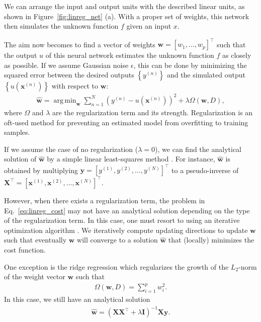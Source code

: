 \documentclass[dissertation,nocontribution,draft*]{aaltoseries}
\newcommand{\vect}[1]{\mathbf{#1}}
\newcommand{\matr}[1]{\mathbf{#1}}
\newcommand{\vx}[0]{\vect{x}}
\newcommand{\vy}[0]{\vect{y}}
\newcommand{\vw}[0]{\vect{w}}
\newcommand{\mX}[0]{\matr{X}}
\newcommand{\mI}{\matr{I}}
\DeclareMathOperator*{\argmin}{arg\,min}
\begin{document}
We can arrange the input and output units with the described
linear units, as shown in Figure~\ref{fig:linreg_net} (a). With
a proper set of weights, this network then simulates
the unknown function $f$ given an input $x$. 

The aim now becomes to find a vector of weights $\vw = [w_1,
\dots, w_p]^\top$ such that the output $u$ of this neural
network estimates the unknown function $f$ as closely as
possible. If we assume Gaussian noise $\epsilon$, this can
be done by minimizing the squared error between the desired
outputs $\left\{ y^{(n)} \right\}$ and the simulated output
$\left\{ u(\vx^{(n)}) \right\}$ with respect to $\vw$:
\begin{align}
    \label{eq:linreg_cost}
    \hat{\vw} = \argmin_{\vw} \sum_{n=1}^N \left( y^{(n)}
    - u\left(\vx^{(n)}\right) \right)^2 + \lambda \Omega
    \left(\vw, D\right),
\end{align}
where $\Omega$ and $\lambda$ are the regularization term and
its strength. Regularization is an oft-used method for
preventing an estimated model from overfitting to training
samples.

If we assume the case of no regularization ($\lambda = 0$),
we can find the analytical solution of $\hat{\vw}$ by a
simple linear least-squares method \citep[see,
e.g.,][]{Golub1996,Haykin2009}.  For instance, $\hat{\vw}$
is obtained by multiplying $\vy = \left[y^{(1)}, y^{(2)},
\dots, y^{(N)} \right]^\top$ to a pseudo-inverse of
$\mX^\top = \left[ \vx^{(1)}, \vx^{(2)}, \dots,
\vx^{(N)}\right]^\top$. 

However, when there exists a regularization term, the
problem in Eq.~\eqref{eq:linreg_cost} may not
have an analytical solution depending on the type of the
regularization term. In this case, one must resort to
using an iterative optimization algorithm \citep[see,
e.g.,][]{Fletcher1987}. We iteratively compute updating
directions to update $\vw$ such that eventually $\vw$ will
converge to a solution $\hat{\vw}$ that (locally) minimizes
the cost function.

One exception is the ridge regression which regularizes the
growth of the $L_2$-norm of the weight vector $\vw$ such
that
\begin{align*}
    \Omega(\vw, D) = \sum_{i=1}^p w_i^2.
\end{align*}
In this case, we still have an analytical solution
\begin{align*}
    \hat{\vw} = \left( \mX \mX^\top + \lambda \mI
    \right)^{-1} \mX \vy.
\end{align*}
\end{document}
